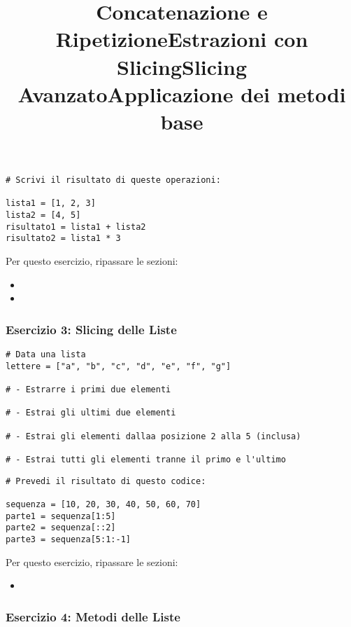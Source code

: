 \title{\textbf{Concatenazione e Ripetizione}}
\begin{lstlisting}
# Scrivi il risultato di queste operazioni:

lista1 = [1, 2, 3]
lista2 = [4, 5]
risultato1 = lista1 + lista2
risultato2 = lista1 * 3
\end{lstlisting}

Per questo esercizio, ripassare le sezioni:
\begin{itemize}
    \item {}
    \item {}
\end{itemize}



\subsubsection{Esercizio 3: Slicing delle Liste}\label{Esercizio3Liste}
\title{\textbf{Estrazioni con Slicing}}

\begin{lstlisting}
# Data una lista
lettere = ["a", "b", "c", "d", "e", "f", "g"]

# - Estrarre i primi due elementi

# - Estrai gli ultimi due elementi

# - Estrai gli elementi dallaa posizione 2 alla 5 (inclusa)

# - Estrai tutti gli elementi tranne il primo e l'ultimo
\end{lstlisting}

\title{\textbf{Slicing Avanzato}}
\begin{lstlisting}
# Prevedi il risultato di questo codice:

sequenza = [10, 20, 30, 40, 50, 60, 70]
parte1 = sequenza[1:5]
parte2 = sequenza[::2]
parte3 = sequenza[5:1:-1]
\end{lstlisting}


Per questo esercizio, ripassare le sezioni:
\begin{itemize}
    \item {}
\end{itemize}

\subsubsection{Esercizio 4: Metodi delle Liste}\label{Esercizio4Liste}
\title{\textbf{Applicazione dei metodi base}}

